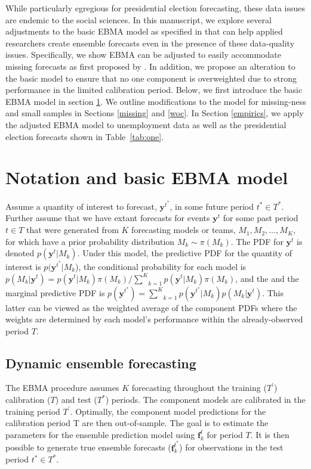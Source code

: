 \documentclass[12pt,fullpage,endnotes]{article}
\begin{document}
While particularly egregious for presidential election forecasting,
these data issues are endemic to the social sciences.  In this manuscript,
we explore several adjustments to the basic EBMA model as specified in
\citet{mhw:2012} that can help applied researchers create ensemble
forecasts even in the presence of these data-quality issues.
Specifically, we show EBMA can be adjusted to easily accommodate
missing forecasts as first proposed by \citep{Fraley:2010}.  In
addition, we propose an alteration to the basic model to ensure that
no one component is overweighted due to strong performance in the
limited calibration period.  Below, we first introduce the basic EBMA
model in section \ref{model}.  We outline modifications to the model
for missing-ness and small samples in Sections \ref{missing} and
\ref{woc}. In Section \ref{empirics}, we apply the adjusted EBMA model
to unemployment data as well as the presidential election forecasts
shown in Table~\ref{tab:one}.


\section{Notation and basic EBMA model} 
\label{model}

Assume a quantity of interest to forecast, $\mathbf{y}^{t^*}$, in some
future period $t^\ast \in T^\ast$.  Further assume that we have extant
forecasts for events $\mathbf{y}^t$ for some past period $t \in T$
that were generated from $K$ forecasting models or teams, $M_1, M_2,
\ldots, M_K$, for which have a prior probability distribution $M_k\sim
\pi(M_k)$. The PDF for $\mathbf{y}^t$ is denoted
$p(\mathbf{y}^t|M_k)$.  Under this model, the predictive PDF for the
quantity of interest is $p(\mathbf{y}^{t^*}|M_k$), the conditional
probability for each model is $p(M_k|\mathbf{y}^t) =
p(\mathbf{y}^t|M_k)\pi(M_k)/\underset{k=1}{\overset{K}{\sum}}p(\mathbf{y}^t|M_k)\pi(M_k)$,
and the and the marginal predictive PDF is $p(\mathbf{y}^{t^*}) =
\underset{k=1}{\overset{K}{\sum}}
p(\mathbf{y}^{t^*}|M_k)p(M_k|\mathbf{y}^{t})$.  This latter can be
viewed as the weighted average of the component PDFs where the weights
are determined by each model's performance within the already-observed
period $T$.

\subsection{Dynamic ensemble forecasting}

The EBMA procedure assumes $K$ forecasting throughout the training
($T^{\prime}$) calibration ($T$) and test ($T^\ast$) periods. The
component models are calibrated in the training period
$T^\prime$. Optimally, the component model predictions for the
calibration period T are then out-of-sample. The goal is to estimate
the parameters for the ensemble prediction model using
$\mathbf{f}^{t}_k$ for period $T$.  It is then possible to generate
true ensemble forecasts ($\mathbf{f}_k^{t^\ast}$) for observations in
the test period $t^\ast \in T^*$.
\end{document}
